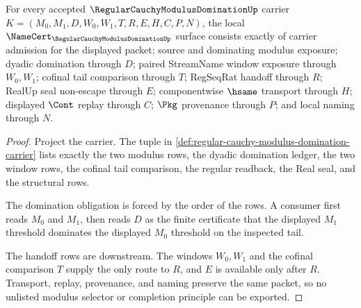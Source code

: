 \begin{theorem}
\label{thm:regular-cauchy-modulus-domination-namecert-obligations}
For every accepted $\RegularCauchyModulusDominationUp$ carrier $K=(M_0,M_1,D,W_0,W_1,T,R,E,H,C,P,N)$, the local $\NameCert_{\RegularCauchyModulusDominationUp}$ surface consists exactly of carrier admission for the displayed packet; source and dominating modulus exposure; dyadic domination through $D$; paired StreamName window exposure through $W_0,W_1$; cofinal tail comparison through $T$; RegSeqRat handoff through $R$; RealUp seal non-escape through $E$; componentwise $\hsame$ transport through $H$; displayed $\Cont$ replay through $C$; $\Pkg$ provenance through $P$; and local naming through $N$.
\end{theorem}
\begin{proof}
Project the carrier. The tuple in \autoref{def:regular-cauchy-modulus-domination-carrier} lists exactly the two modulus rows, the dyadic domination ledger, the two window rows, the cofinal tail comparison, the regular readback, the Real seal, and the structural rows.

The domination obligation is forced by the order of the rows. A consumer first reads $M_0$ and $M_1$, then reads $D$ as the finite certificate that the displayed $M_1$ threshold dominates the displayed $M_0$ threshold on the inspected tail.

The handoff rows are downstream. The windows $W_0,W_1$ and the cofinal comparison $T$ supply the only route to $R$, and $E$ is available only after $R$. Transport, replay, provenance, and naming preserve the same packet, so no unlisted modulus selector or completion principle can be exported.
\end{proof}

